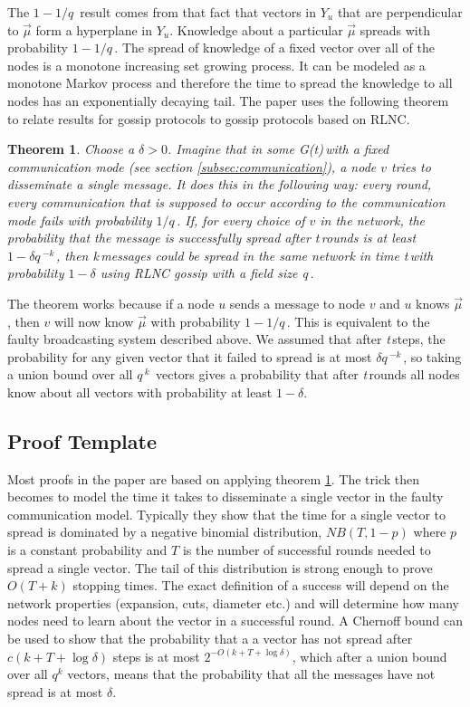 \documentclass{article} %
\newtheorem{theorem}{Theorem}
\def\graph{\textit{G(t)}\,}
\def\graphtime{\textit{t}\,}
\def\numMessages{\textit{k}\,}
\def\fieldSize{\textit{q}\,}
\begin{document}
The $1-1/\fieldSize$ result comes from that fact that vectors in $Y_u$ that are perpendicular to $\vec{\mu}$ form a hyperplane in $Y_u$. Knowledge about a particular $\vec{\mu}$ spreads with probability $1-1/\fieldSize$. The spread of knowledge of a fixed vector over all of the nodes is a monotone increasing set growing process. It can be modeled as a monotone Markov process and therefore the time to spread the knowledge to all nodes has an exponentially decaying tail. The paper uses the following theorem to relate results for gossip protocols to gossip protocols based on RLNC. 
\begin{theorem}\label{theorem:template}
Choose a $\delta > 0$. Imagine that in some \graph with a fixed communication mode (see section \ref{subsec:communication}), a node $v$ tries to disseminate a single message. It does this in the following way: every round, every communication that is supposed to occur according to the communication mode fails with probability $1/\fieldSize$. If, for every choice of $v$ in the network, the probability that the message is successfully spread after \graphtime rounds is at least $1-\delta\fieldSize^{-\numMessages}$, then \numMessages messages could be spread in the same network in time \graphtime with probability $1-\delta$ using RLNC gossip with a field size \fieldSize. 
\end{theorem}
The theorem works because if a node $u$ sends a message to node $v$ and $u$ knows $\vec{\mu}$, then $v$ will now know $\vec{\mu}$ with probability $1-1/\fieldSize$. This is equivalent to the faulty broadcasting system described above. We assumed that after \graphtime steps, the probability for any given vector that it failed to spread is at most $\delta\fieldSize^{-\numMessages}$, so taking a union bound over all $\fieldSize^{\numMessages}$ vectors gives a probability that after \graphtime rounds all nodes know about all vectors with probability at least $1-\delta$.

\subsection{Proof Template}\label{subsec:template}
Most proofs in the paper are based on applying theorem \ref{theorem:template}. The trick then becomes to model the time it takes to disseminate a single vector in the faulty communication model. Typically they show that the time for a single vector to spread is dominated by a negative binomial distribution, $NB(T,1-p)$ where $p$ is a constant probability and $T$ is the number of successful rounds needed to spread a single vector. The tail of this distribution is strong enough to prove $O(T+k)$ stopping times. The exact definition of a success will depend on the network properties (expansion, cuts, diameter etc.) and will determine how many nodes need to learn about the vector in a successful round. A Chernoff bound can be used to show that the probability that a a vector has not spread after $c(k+T+\log{\delta})$ steps is at most $2^{-O(k+T+\log{\delta})}$, which after a union bound over all $q^k$ vectors, means that the probability that all the messages have not spread is at most $\delta$. 
\end{document}
